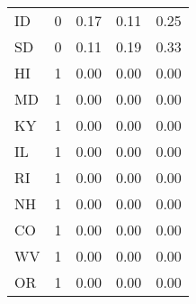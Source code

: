 \begin{table}[ht]
\begin{tabular}{lrrrr}
  ID & 0 & 0.17 & 0.11 & 0.25 \\ 
  SD & 0 & 0.11 & 0.19 & 0.33 \\ 
  HI & 1 & 0.00 & 0.00 & 0.00 \\ 
  MD & 1 & 0.00 & 0.00 & 0.00 \\ 
  KY & 1 & 0.00 & 0.00 & 0.00 \\ 
  IL & 1 & 0.00 & 0.00 & 0.00 \\ 
  RI & 1 & 0.00 & 0.00 & 0.00 \\ 
  NH & 1 & 0.00 & 0.00 & 0.00 \\ 
  CO & 1 & 0.00 & 0.00 & 0.00 \\ 
  WV & 1 & 0.00 & 0.00 & 0.00 \\ 
  OR & 1 & 0.00 & 0.00 & 0.00 \\ 
   \hline
\end{tabular}
\end{table}
